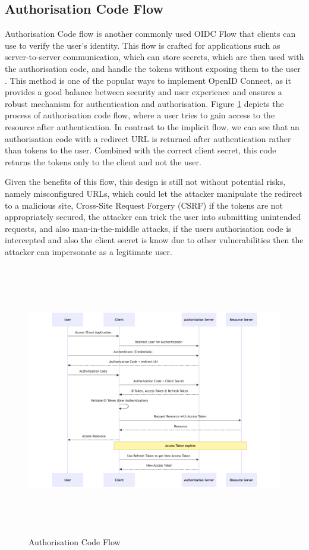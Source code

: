 \subsection{Authorisation Code Flow}
Authorisation Code flow is another commonly used OIDC Flow that clients can use to verify the user's identity. This flow is crafted for applications such as server-to-server communication, which can store secrets, which are then used with the authorisation code, and handle the tokens without exposing them to the user \citep{auth_flow_oidc}. This method is one of the popular ways to implement OpenID Connect, as it provides a good balance between security and user experience and ensures a robust mechanism for authentication and authorisation. Figure \ref{fig:authorisation_flow} depicts the process of authorisation code flow, where a user tries to gain access to the resource after authentication. In contrast to the implicit flow, we can see that an authorisation code with a redirect URL is returned after authentication rather than tokens to the user. Combined with the correct client secret, this code returns the tokens only to the client and not the user. 

Given the benefits of this flow, this design is still not without potential risks, namely misconfigured URLs, which could let the attacker manipulate the redirect to a malicious site, Cross-Site Request Forgery (CSRF) if the tokens are not appropriately secured, the attacker can trick the user into submitting unintended requests, and also man-in-the-middle attacks, if the users authorisation code is intercepted and also the client secret is know due to other vulnerabilities then the attacker can impersonate as a legitimate user.

\begin{figure}[h!]
\centering
\label{fig:authorisation_flow}
\includegraphics[width=\textwidth, height=450px]{pics/authorisation_flow.png}
\caption{Authorisation Code Flow}
\end{figure}


